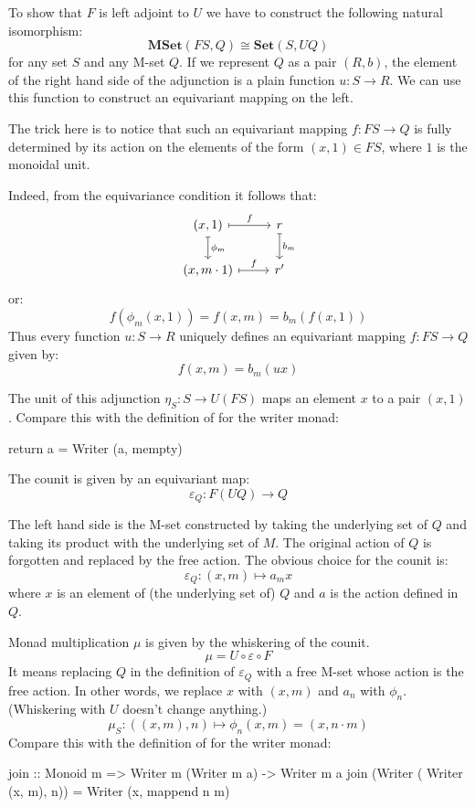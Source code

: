 \documentclass[DaoFP]{subfiles}
\begin{document}
To show that $F$ is left adjoint to $U$ we have to construct the following natural isomorphism:
\[ \mathbf{MSet}( F S, Q) \cong \mathbf{Set}(S, U Q) \]
for any set $S$ and any M-set $Q$. If we represent $Q$ as a pair $(R, b)$, the element of the right hand side of the adjunction is a plain function $u \colon S \to R$. We can use this function to construct an equivariant mapping on the left.

The trick here is to notice that such  an equivariant mapping $f \colon F S \to Q$ is fully determined by its action on the elements of the form $(x, 1) \in F S$, where $1$ is the monoidal unit. 

Indeed, from the equivariance condition it follows that:
\[
 \begin{tikzcd}
 (x, 1)
 \arrow[r, mapsto, "f"]
 \arrow[d, mapsto, "\phi_m"]
 & r
\arrow[d, mapsto, "b_m"]
 \\
(x, m \cdot 1)
 \arrow[r, mapsto, "f"]
 & r'
  \end{tikzcd}
\]
or:
\[ f( \phi_m (x, 1)) = f (x, m) = b_m ( f (x, 1)) \]
Thus every function $u \colon S \to R$ uniquely defines an equivariant mapping $f \colon F S \to Q$ given by:
\[ f (x, m) = b_m (u x) \]

The unit of this adjunction $\eta_S \colon S \to U (F S)$ maps an element $x$ to a pair $(x, 1)$. Compare this with the definition of  for the writer monad:
\begin{haskell}
return a = Writer (a, mempty)
\end{haskell}

The counit is given by an equivariant map:
\[ \varepsilon_Q \colon F (U Q) \to Q \]

The left hand side is the M-set constructed by taking the underlying set of $Q$ and taking its product with the underlying set of $M$. The original action of $Q$ is forgotten and replaced by the free action. The obvious choice for the counit is:
\[ \varepsilon_Q \colon (x, m) \mapsto a_m x \]
where $x$ is an element of (the underlying set of) $Q$ and $a$ is the action defined in $Q$.

Monad multiplication $\mu$ is given by the whiskering of the counit.
\[ \mu = U \circ \varepsilon \circ F \]
It means replacing $Q$ in the definition of $\varepsilon_Q$ with a free M-set whose action is the free action. In other words, we replace $x$ with $(x, m)$ and $a_n$ with $\phi_n$. (Whiskering with $U$ doesn't change anything.)
\[ \mu_S \colon ((x, m), n) \mapsto \phi_n (x, m) = (x, n \cdot m) \]
Compare this with the definition of  for the writer monad:
\begin{haskell}
join :: Monoid m => Writer m (Writer m a) -> Writer m a
join (Writer ( Writer (x, m), n)) = Writer (x, mappend n m)
\end{haskell}
\end{document}
